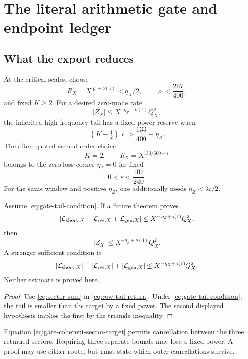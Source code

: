 \section{The literal arithmetic gate and endpoint ledger}
\label{sec:physical-gate}

\subsection{What the export reduces}

At the critical scales, choose
\[
 R_X=X^{\varrho+o(1)}<q_X/2,\qquad
 \varrho<\frac{267}{400},
\]
and fixed \(K\ge2\).  For a desired zero-mode rate
\[
 |Z_X|\le X^{-\eta_Z+o(1)}Q_X^2,
\]
the inherited high-frequency tail has a fixed-power reserve when
\begin{equation}
 (K-\tfrac12)\varrho
 >
 \frac{133}{400}+\eta_Z.
\label{eq:gate-tail-condition}
\end{equation}
The often quoted second-order choice
\[
 K=2,\qquad
 R_X=X^{133/600+\varepsilon}
\]
belongs to the zero-loss corner \(\eta_Z=0\) for fixed
\[
 0<\varepsilon<\frac{107}{240}.
\]
For the same window and positive \(\eta_Z\), one additionally needs
\(\eta_Z<3\varepsilon/2\).

\begin{theorem}
\label{thm:sector-certificate}
Assume \eqref{eq:gate-tail-condition}.  If a future theorem proves
\begin{equation}
 \left|
 \mathcal L_{\mathrm{short},X}
 +\mathcal L_{\mathrm{res},X}
 +\mathcal L_{\mathrm{gen},X}
 \right|
 \le
 X^{-\eta_Z+o(1)}Q_X^2,
\label{eq:gate-coherent-sector-target}
\end{equation}
then
\[
 |Z_X|\le X^{-\eta_Z+o(1)}Q_X^2.
\]
A stronger sufficient condition is
\begin{equation}
 |\mathcal L_{\mathrm{short},X}|
 +|\mathcal L_{\mathrm{res},X}|
 +|\mathcal L_{\mathrm{gen},X}|
 \le
 X^{-\eta_Z+o(1)}Q_X^2.
\label{eq:gate-separate-sector-target}
\end{equation}
Neither estimate is proved here.
\end{theorem}

\begin{proof}
Use \eqref{eq:sector-sum} in
\eqref{eq:row-tail-return}.  Under
\eqref{eq:gate-tail-condition}, the tail is smaller than the target
by a fixed power.  The second displayed hypothesis implies the first
by the triangle inequality.
\end{proof}

\begin{remark}
Equation \eqref{eq:gate-coherent-sector-target} permits cancellation
between the three returned sectors.  Requiring three separate bounds
may lose a fixed power.  A proof may use either route, but must state
which outer cancellations survive.
\end{remark}

